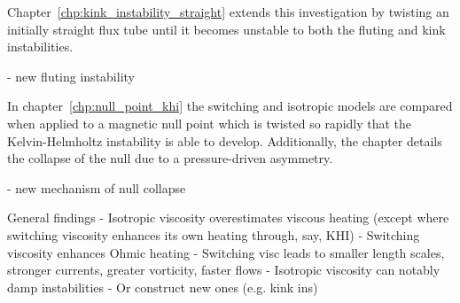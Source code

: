 Chapter~\ref{chp:kink_instability_straight} extends this investigation by twisting an initially straight flux tube until it becomes unstable to both the fluting and kink instabilities.

- new fluting instability

In chapter~\ref{chp:null_point_khi} the switching and isotropic models are compared when applied to a magnetic null point which is twisted so rapidly that the Kelvin-Helmholtz instability is able to develop. Additionally, the chapter details the collapse of the null due to a pressure-driven asymmetry.

- new mechanism of null collapse

General findings
- Isotropic viscosity overestimates viscous heating (except where switching viscosity enhances its own heating through, say, KHI)
- Switching viscosity enhances Ohmic heating
- Switching visc leads to smaller length scales, stronger currents, greater vorticity, faster flows
- Isotropic viscosity can notably damp instabilities
- Or construct new ones (e.g. kink ins)

